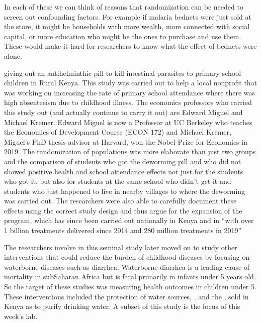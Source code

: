 \documentclass[letterpaper,10pt,english]{jupyterBook}
\begin{document}
\sphinxAtStartPar
In each of these we can think of reasons that randomization can be needed to screen out confounding factors. For example if malaria bednets were just sold at the store, it might be households with more wealth, more connected with social capital, or more education who might be the ones to purchase and use them.  These  would make it hard for researchers to know what the effect of bednets were alone.

\sphinxAtStartPar
{} \sphinxhyphen{} giving out an anti\sphinxhyphen{}helminthic pill to kill intestinal parasites \sphinxhyphen{} to primary school children in Rural Kenya.  This study was carried out to help a local non\sphinxhyphen{}profit that was working on increasing the rate of primary school attendance where there was high absenteeism due to childhood illness.  The economics professors who carried this study out (and actually continue to carry it out) are Edward Miguel and Michael Kremer.  Edward Miguel is now a Professor at UC Berkeley who teaches the Economics of Development Course (ECON 172) and Michael Kremer, Miguel’s PhD thesis advisor at Harvard, won the Nobel Prize for Economics in 2019.  The randomization of populations was more elaborate than just two groups and the comparison of students who got the deworming pill and who did not showed positive health  and school attendance effects not just for the students who got it, but also for students at the same school who didn’t get it and students who just happened to live in nearby villages to where the deworming was carried out.   The researchers were also able to carefully document these effects using the correct study design and thus argue for the expansion of the program, which has since been carried out nationally in Kenya and in  “with over 1 billion treatments delivered since 2014 and 280 million treatments in 2019”

\sphinxAtStartPar
The researchers involve in this seminal study later moved on to study other interventions that could reduce the burden of childhood diseases by focusing on water\sphinxhyphen{}borne diseases such as diarrhea.  Water\sphinxhyphen{}borne diarrhea is a leading cause of mortality in sub\sphinxhyphen{}Saharan Africa but is fatal primarily in infants under 5 years old. So the target of these studies was measuring health outcomes in children under 5.  These interventions included the protection of water sources, ,  and the , sold in Kenya as  to purify drinking water.  A subset of this study is the focus of this week’s lab.
\end{document}
